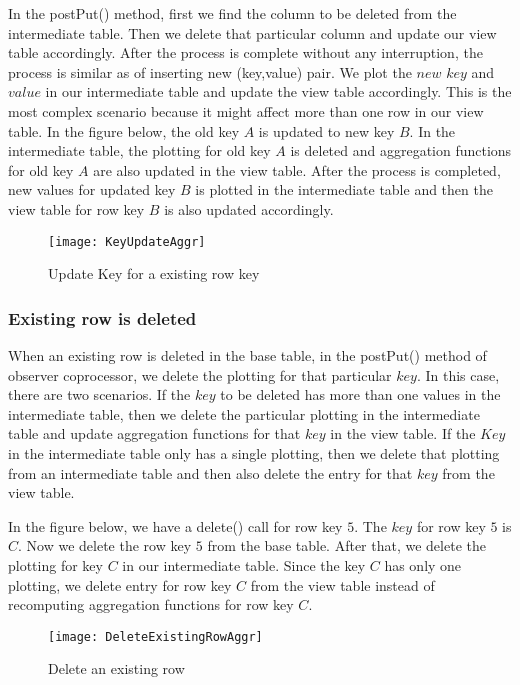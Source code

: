 \documentclass[11pt,a4paper,bibtotoc,idxtotoc,headsepline,footsepline,footexclude,BCOR12mm,DIV13]{scrbook}
\begin{document}
In the postPut() method, first we find the column to be deleted from the intermediate table. Then we delete that particular column and update our view table accordingly. After the process is complete without any interruption, the process is similar as of inserting new (key,value) pair. We plot the $new$ $key$ and $value$ in our intermediate table and update the view table accordingly. This is the most complex scenario because it might affect more than one row in our view table. In the figure below, the old key $A$ is updated to new key $B$. In the intermediate table, the plotting for old key $A$ is deleted and aggregation functions for old key $A$ are also updated in the view table. After the process is completed, new values for updated key $B$ is plotted in the intermediate table and then the view table for row key $B$ is also updated accordingly.

\begin{figure}
    \centering
    \texttt{[image: KeyUpdateAggr]}
    \caption{Update Key for a existing row key}
    \label{sec:updateKeyforexistingrow}
    
\end{figure} 

\newpage
\subsubsection{Existing row is deleted}
\label{subsubsec:rowdelete}
When an existing row is deleted in the base table, in the postPut() method of observer coprocessor, we delete the plotting for that particular $key$. In this case, there are two scenarios. If the $key$ to be deleted has more than one values in the intermediate table, then we delete the particular plotting in the intermediate table and update aggregation functions for that $key$ in the view table. If the $Key$ in the intermediate table only has a single plotting, then we delete that plotting from an intermediate table and then also delete the entry for that $key$ from the view table.

In the figure below, we have a delete() call for row key $5$. The $key$ for row key $5$ is $C$. Now we delete the row key $5$ from the base table. After that, we delete the plotting for key $C$ in our intermediate table. Since the key $C$ has only one plotting, we delete entry for row key $C$ from the view table instead of recomputing aggregation functions for row key $C$. 

\begin{figure}
    \centering
    \texttt{[image: DeleteExistingRowAggr]}
    \caption{Delete an existing row}
    \label{sec:deleteexistingrow}
    
\end{figure} 
\end{document}
